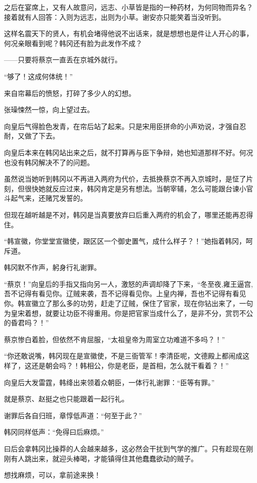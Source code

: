 之后在宴席上，又有人故意问，远志、小草皆是指的一种药材，为何同物而异名？接着就有人回答：入则为远志，出则为小草。谢安亦只能笑着当没听到。

这样名震天下的贤人，有机会堵得他说不出话来，就是想想也是件让人开心的事，何况亲眼看到呢？韩冈还有脸为此发作不成？

——只要将蔡京一直丢在京城外就行。

“够了！这成何体统！”

来自帘幕后的愤怒，打碎了多少人的幻想。

张璪悚然一惊，向上望过去。

向皇后气得脸色发青，在帘后站了起来。只是宋用臣拼命的小声劝说，才强自忍耐，又做了下去。

向皇后本来在韩冈站出来之后，就不打算再与臣下争辩，她也知道那样不好。何况也没有韩冈解决不了的问题。

虽然说当她听到韩冈以不再进入两府为代价，去抵换蔡京不再入京城时，是怔了片刻，但很快她就反应过来，韩冈肯定是另有想法。当朝宰辅，怎么可能跟台谏小官斗起气来，还赌咒发誓的。

但现在越听越是不对，韩冈是当真要放弃曰后重入两府的机会了，哪里还能再忍得住。

“韩宣徽，你堂堂宣徽使，跟区区一个御史置气，成什么样子？！”她指着韩冈，呵斥道。

韩冈默不作声，躬身行礼谢罪。

“蔡京！”向皇后的手指又指向另一人，激怒的声调却降了下来，“冬至夜,雍王逼宫,吾不记得有看见你。辽贼来袭，吾不记得看见你。上皇内禅，吾也不记得有看见你。韩宣徽立了那么多的功劳，赶走了辽贼，保住了官家，现在你钻出来了，一句为皇宋着想，就要让功臣不得重用。你是把官家当成什么了，是非不分，赏罚不公的昏君吗？！”

蔡京惨白着脸，但依然不肯屈服，“太祖皇帝为周室立功难道不多吗？！”

“你还敢说嘴，韩冈现在是宣徽使，不是三衙管军！李清臣呢，文德殿上都闹成这样了，这还是朝会吗？！韩相公，你是老臣，是首相，怎么就干看着？！”

向皇后大发雷霆，韩绛出来领着众朝臣，一体行礼谢罪：“臣等有罪。”

就是蔡京、赵挺之也只能跟着一起行礼。

谢罪后各自归班，章惇低声道：“何至于此？”

韩冈同样低声：“免得曰后麻烦。”

曰后会拿韩冈比操莽的人会越来越多，这必然会干扰到气学的推广。只有趁现在刚刚有人跳出来，就迎头棒喝，才能镇得住其他蠢蠢欲动的贼子。

想找麻烦，可以，拿前途来换！

